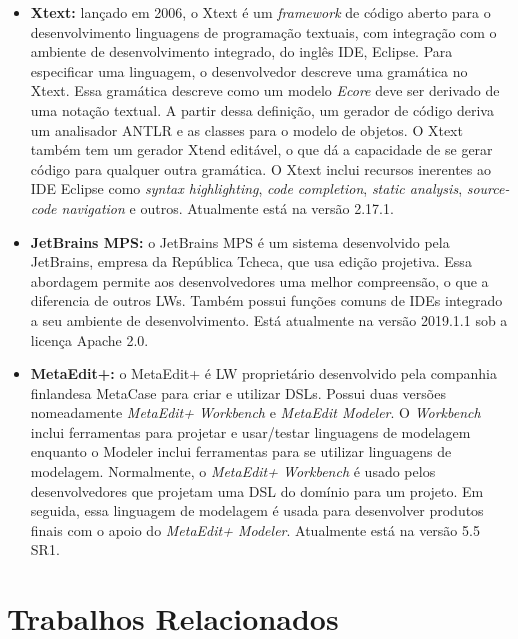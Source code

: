 \begin{itemize}
    \item \textbf{Xtext:} lançado em 2006, o Xtext é um \textit{framework} de código aberto para o desenvolvimento linguagens de programação textuais, com integração com o ambiente de desenvolvimento integrado, do inglês \ac{IDE}, Eclipse. 
    Para especificar uma linguagem, o desenvolvedor descreve uma gramática no Xtext. 
    Essa gramática descreve como um modelo \textit{Ecore} deve ser derivado de uma notação textual. 
    A partir dessa definição, um gerador de código deriva um analisador ANTLR e as classes para o modelo de objetos. 
    O Xtext também tem um gerador Xtend editável, o que dá a capacidade de se gerar código para qualquer outra gramática. 
    O Xtext inclui recursos inerentes ao \ac{IDE} Eclipse como \textit{syntax highlighting}, \textit{code completion}, \textit{static analysis}, \textit{source-code navigation} e outros. 
    Atualmente está na versão 2.17.1.
    
    \item \textbf{JetBrains MPS:} o JetBrains MPS é um sistema desenvolvido pela JetBrains, empresa da República Tcheca, que usa edição projetiva. 
    Essa abordagem permite aos desenvolvedores uma melhor compreensão, o que a diferencia de outros \acp{LW}. 
    Também possui funções comuns de \acp{IDE} integrado a seu ambiente de desenvolvimento. 
    Está atualmente na versão 2019.1.1 sob a licença Apache 2.0.
    
    \item \textbf{MetaEdit+:} o MetaEdit+ é \ac{LW} proprietário desenvolvido pela companhia finlandesa MetaCase para criar e utilizar \acp{DSL}. 
    Possui duas versões nomeadamente \textit{MetaEdit+ Workbench} e \textit{MetaEdit Modeler}. 
    O \textit{Workbench} inclui ferramentas para projetar e usar/testar linguagens de modelagem enquanto o Modeler inclui ferramentas para se utilizar linguagens de modelagem. 
    Normalmente, o \textit{MetaEdit+ Workbench} é usado pelos desenvolvedores que projetam uma \ac{DSL} do domínio para um projeto. 
    Em seguida, essa linguagem de modelagem é usada para desenvolver produtos finais com o apoio do \textit{MetaEdit+ Modeler}. 
    Atualmente está na versão 5.5 SR1.
\end{itemize}


\section{Trabalhos Relacionados} \label{sec:TrabRelacionados}


